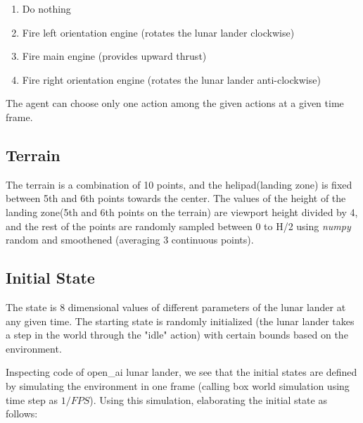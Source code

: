 \documentclass[12pt]{article}
\begin{document}
\begin{enumerate}[label=(\alph*)]
\item Do nothing
\item Fire left orientation engine (rotates the lunar lander clockwise)
\item Fire main engine (provides upward thrust)
\item Fire right orientation engine (rotates the lunar lander anti-clockwise)
\end{enumerate}

The agent can choose only one action among the given actions at a given time frame.

\subsection{Terrain} 
The terrain is a combination of 10 points, and the helipad(landing zone) is fixed between 5th and 6th points towards the center. The values of the height of the landing zone(5th and 6th points on the terrain) are viewport height divided by 4, and the rest of the points are randomly sampled between 0 to H/2 using \textit{numpy} random and smoothened (averaging 3 continuous points).

\subsection{Initial State}

The state is 8 dimensional values of different parameters of the lunar lander at any given time. The starting state is randomly initialized (the lunar lander takes a step in the world through the "idle" action) with certain bounds based on the environment.

Inspecting code of open\_ai lunar lander, we see that the initial states are defined by simulating the environment in one frame (calling box world simulation using time step as $1/FPS$). Using this simulation, elaborating the initial state as follows:
\end{document}
